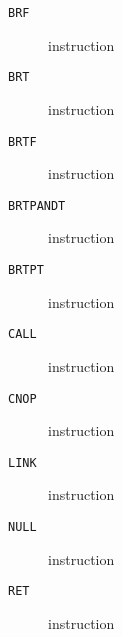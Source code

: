 \clearpage
\begin{description}
\item[\texttt{BRF}] instruction\\

\end{description}
\clearpage
\begin{description}
\item[\texttt{BRT}] instruction\\

\end{description}
\clearpage
\begin{description}
\item[\texttt{BRTF}] instruction\\

\end{description}
\clearpage
\begin{description}
\item[\texttt{BRTPANDT}] instruction\\

\end{description}
\clearpage
\begin{description}
\item[\texttt{BRTPT}] instruction\\

\end{description}
\clearpage
\begin{description}
\item[\texttt{CALL}] instruction\\

\end{description}
\clearpage
\begin{description}
\item[\texttt{CNOP}] instruction\\

\end{description}
\clearpage
\begin{description}
\item[\texttt{LINK}] instruction\\

\end{description}
\clearpage
\begin{description}
\item[\texttt{NULL}] instruction\\

\end{description}
\clearpage
\begin{description}
\item[\texttt{RET}] instruction\\

\end{description}
\clearpage
